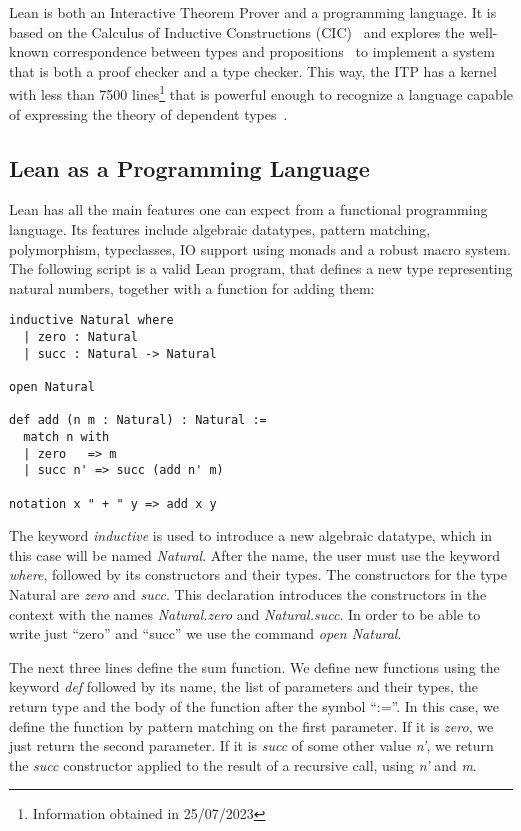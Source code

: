 Lean is both an Interactive Theorem Prover and a programming
language. It is based on the Calculus of Inductive Constructions (CIC)~\cite{cic_ref} and explores the well-known correspondence between types and propositions~\cite{ch_correspondence} to implement a system that is both a proof checker and a type checker. This way, the ITP has a kernel with less than 7500 lines\footnote{Information obtained in 25/07/2023} that is powerful enough to recognize a language capable of expressing the theory of dependent types~\cite{dep_type_theory}.

\subsection{Lean as a Programming Language}

Lean has all the main features one can expect from a functional programming language. Its features include algebraic datatypes, pattern matching, polymorphism, typeclasses, IO support using monads and a robust macro system. The following script is a valid Lean program, that defines a new type representing natural numbers, together with a function for adding them:

\begin{verbatim}
inductive Natural where
  | zero : Natural
  | succ : Natural -> Natural

open Natural

def add (n m : Natural) : Natural :=
  match n with
  | zero   => m
  | succ n' => succ (add n' m)

notation x " + " y => add x y
\end{verbatim}

The keyword \textit{inductive} is used to introduce a new algebraic datatype, which in this case will be named \textit{Natural}. After the name, the user must use the keyword \textit{where}, followed by its constructors and their types. The constructors for the type Natural are \textit{zero} and \textit{succ}. This declaration introduces the constructors in the context with the names \textit{Natural.zero} and \textit{Natural.succ}. In order to be able to write just ``zero'' and ``succ'' we use the command \textit{open Natural}.

The next three lines define the sum function. We define new functions using the keyword \textit{def} followed by its name, the list of parameters and their types, the return type and the body of the function after the symbol ``:=''. In this case, we define the function by pattern matching on the first parameter. If it is \textit{zero}, we just return the second parameter. If it is \textit{succ} of some other value \textit{n'}, we return the \textit{succ} constructor applied to the result of a recursive call, using \textit{n'} and \textit{m}.

